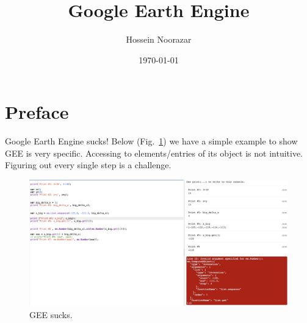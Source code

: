 \documentclass{article}
\title{Google Earth Engine}
\author{Hossein Noorazar}
\date{\today}
\begin{document}
\maketitle
\tableofcontents

\clearpage

\section{Preface}
Google Earth Engine sucks! 
Below (Fig.~\ref{fig:GEESucks}) 
we have a simple example to show GEE is very specific.
Accessing to elements/entries of its object is not
intuitive. Figuring out every single step is a 
challenge.
\begin{figure}[H]
  \centering
  \includegraphics[width=1\textwidth]{figures/GEE_Sucks}
  \caption{GEE sucks.}
  \label{fig:GEESucks}
\end{figure}
\end{document}
